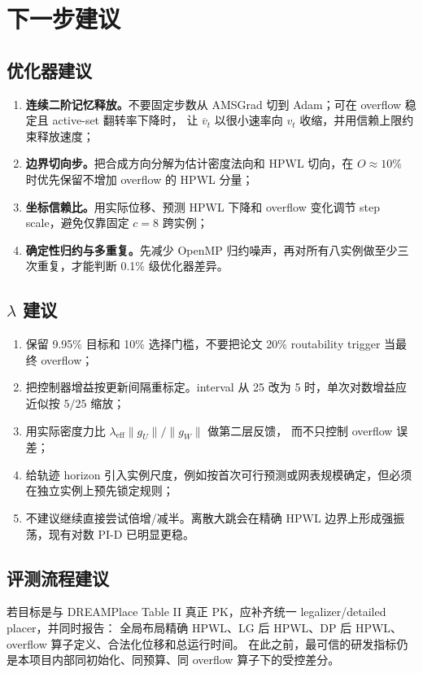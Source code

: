 \documentclass[UTF8,fontset=windows,a4paper,11pt]{ctexart}
\begin{document}
\section{下一步建议}

\subsection{优化器建议}
\begin{enumerate}
  \item \textbf{连续二阶记忆释放。}不要固定步数从 AMSGrad 切到 Adam；可在 overflow 稳定且 active-set 翻转率下降时，
  让 $\overline v_t$ 以很小速率向 $v_t$ 收缩，并用信赖上限约束释放速度；
  \item \textbf{边界切向步。}把合成方向分解为估计密度法向和 HPWL 切向，在 $O\approx10\%$ 时优先保留不增加 overflow 的 HPWL 分量；
  \item \textbf{坐标信赖比。}用实际位移、预测 HPWL 下降和 overflow 变化调节 step scale，避免仅靠固定 $c=8$ 跨实例；
  \item \textbf{确定性归约与多重复。}先减少 OpenMP 归约噪声，再对所有八实例做至少三次重复，才能判断 0.1\% 级优化器差异。
\end{enumerate}

\subsection{$\lambda$ 建议}
\begin{enumerate}
  \item 保留 9.95\% 目标和 10\% 选择门槛，不要把论文 20\% routability trigger 当最终 overflow；
  \item 把控制器增益按更新间隔重标定。interval 从 25 改为 5 时，单次对数增益应近似按 $5/25$ 缩放；
  \item 用实际密度力比 $\lambda_{\mathrm{eff}}\lVert g_U\rVert/\lVert g_W\rVert$ 做第二层反馈，
  而不只控制 overflow 误差；
  \item 给轨迹 horizon 引入实例尺度，例如按首次可行预测或网表规模确定，但必须在独立实例上预先锁定规则；
  \item 不建议继续直接尝试倍增/减半。离散大跳会在精确 HPWL 边界上形成强振荡，现有对数 PI-D 已明显更稳。
\end{enumerate}

\subsection{评测流程建议}

若目标是与 DREAMPlace Table II 真正 PK，应补齐统一 legalizer/detailed placer，并同时报告：
全局布局精确 HPWL、LG 后 HPWL、DP 后 HPWL、overflow 算子定义、合法化位移和总运行时间。
在此之前，最可信的研发指标仍是本项目内部同初始化、同预算、同 overflow 算子下的受控差分。
\end{document}
